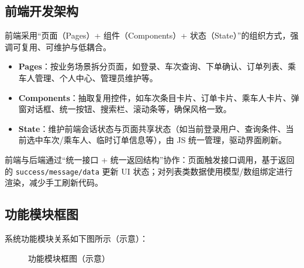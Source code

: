 \documentclass{article}
\begin{document}
	\subsection{前端开发架构}
	前端采用“页面（Pages）+ 组件（Components）+ 状态（State）”的组织方式，强调可复用、可维护与低耦合。
	\begin{itemize}
		\item \textbf{Pages}：按业务场景拆分页面，如登录、车次查询、下单确认、订单列表、乘车人管理、个人中心、管理员维护等。
		\item \textbf{Components}：抽取复用控件，如车次条目卡片、订单卡片、乘车人卡片、弹窗对话框、统一按钮、搜索栏、滚动条等，确保风格一致。
		\item \textbf{State}：维护前端会话状态与页面共享状态（如当前登录用户、查询条件、当前选中车次/乘车人、临时订单信息等），由 JS 统一管理，驱动界面刷新。
	\end{itemize}
	
	前端与后端通过“统一接口 + 统一返回结构”协作：页面触发接口调用，基于返回的 \texttt{success/message/data} 更新 UI 状态；对列表类数据使用模型/数组绑定进行渲染，减少手工刷新代码。
	
	\subsection{功能模块框图}
	系统功能模块关系如下图所示（示意）：
	\begin{figure}[H]
		\centering
		\caption{功能模块框图（示意）}
	\end{figure}
	
\end{document}
